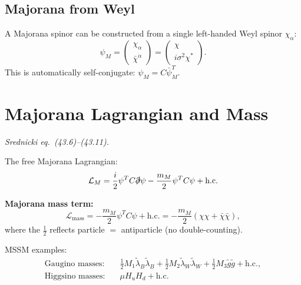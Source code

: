 \documentclass[12pt]{article}
\begin{document}
\subsection{Majorana from Weyl}

A Majorana spinor can be constructed from a single left-handed Weyl spinor $\chi_\alpha$:
\begin{equation}
  \psi_M = \begin{pmatrix}\chi_\alpha \\ \bar\chi^{\dot\alpha}\end{pmatrix}
  = \begin{pmatrix}\chi \\ i\sigma^2\chi^*\end{pmatrix}.
\end{equation}
This is automatically self-conjugate: $\psi_M = C\bar\psi_M^T$.

\section{Majorana Lagrangian and Mass}

\textit{Srednicki eq.\ (43.6)--(43.11).}

The free Majorana Lagrangian:
\begin{equation}
  \mathcal{L}_M = \frac{i}{2}\psi^T C\slashed\partial\psi
               - \frac{m_M}{2}\psi^T C\psi + \text{h.c.}
\end{equation}

\begin{mdframed}[backgroundcolor=blue!5]
\textbf{Majorana mass term:}
\begin{equation}\label{eq:majorana-mass}
  \mathcal{L}_\text{mass} = -\frac{m_M}{2}\psi^T C\psi + \text{h.c.}
  = -\frac{m_M}{2}(\chi\chi + \bar\chi\bar\chi),
\end{equation}
where the $\tfrac{1}{2}$ reflects particle $=$ antiparticle (no double-counting).
\end{mdframed}

MSSM examples:
\begin{align}
  \text{Gaugino masses:} &\quad \frac{1}{2}M_1\tilde\lambda_B\tilde\lambda_B
                                + \frac{1}{2}M_2\tilde\lambda_W\tilde\lambda_W
                                + \frac{1}{2}M_3\tilde g\tilde g + \text{h.c.},\\
  \text{Higgsino masses:} &\quad \mu H_u H_d + \text{h.c.}
\end{align}
\end{document}
